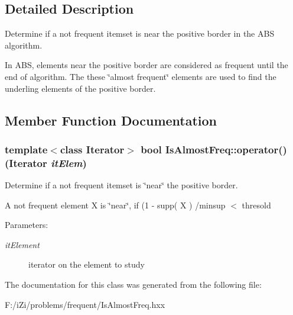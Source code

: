 \subsection{Detailed Description}
Determine if a not frequent itemset is near the positive border in the ABS algorithm. 

In ABS, elements near the positive border are considered as frequent until the end of algorithm. The these \char`\"{}almost frequent\char`\"{} elements are used to find the underling elements of the positive border. 



\subsection{Member Function Documentation}
\subsubsection{\setlength{\rightskip}{0pt plus 5cm}template$<$class Iterator$>$ bool Is\-Almost\-Freq::operator() (Iterator {\em it\-Elem})\hspace{0.3cm}{\tt  [inline]}}\label{class_is_almost_freq_aed551b7b0b631e981fbecb0090aa170}


Determine if a not frequent itemset is \char`\"{}near\char`\"{} the positive border. 

A not frequent element X is \char`\"{}near\char`\"{}, if (1 - supp( X ) /minsup $<$ thresold \begin{Desc}
\item[Parameters:]
\begin{description}
\item[{\em it\-Element}]iterator on the element to study \end{description}
\end{Desc}


The documentation for this class was generated from the following file:\begin{CompactItemize}
\item 
F:/i\-Zi/problems/frequent/Is\-Almost\-Freq.hxx\end{CompactItemize}
